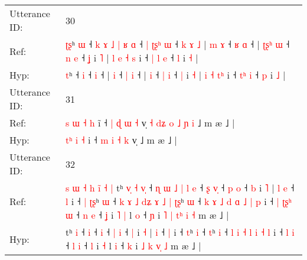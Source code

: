 \documentclass[10pt]{article}
\DeclareRobustCommand{\hl}[1]{{\textcolor{red}{#1}}}
\begin{document}
\begin{longtable}{ll}
 \\
\midrule
Utterance ID: & 30 \\
Ref: & \hl{ʈ}\hl{ʂ}ʰ\hl{ }\hl{ɯ} ˧\hl{ }\hl{k}\hl{ }\hl{ɤ}\hl{ }\hl{˩}\hl{ }\hl{|}\hl{ }\hl{ʁ} \hl{ɑ} ˧\hl{ }\hl{|}\hl{ }\hl{ʈ}\hl{ʂ}\hl{ʰ} \hl{ɯ} ˧\hl{ }\hl{k}\hl{ }\hl{ɤ}\hl{ }\hl{˩} |\hl{ }\hl{m} \hl{ɤ} ˧ \hl{ʁ} \hl{ɑ} ˧ |\hl{ }\hl{ʈ}\hl{ʂ}\hl{ʰ} \hl{ɯ} ˧ \hl{n} \hl{e} ˧ \hl{ʝ} i \hl{˥} | \hl{l} \hl{e} \hl{˧}\hl{ }\hl{s} i ˧ \hl{|}\hl{ }\hl{l} \hl{e} ˧ \hl{l} i \hl{˧} |
 \\
Hyp: & \hl{}\hl{t}ʰ\hl{}\hl{} ˧\hl{}\hl{}\hl{}\hl{}\hl{}\hl{}\hl{}\hl{}\hl{}\hl{} \hl{i} ˧\hl{}\hl{}\hl{}\hl{}\hl{}\hl{} \hl{i} ˧\hl{}\hl{}\hl{}\hl{}\hl{}\hl{} |\hl{}\hl{} \hl{i} ˧ \hl{|} \hl{i} ˧ |\hl{}\hl{}\hl{}\hl{} \hl{i} ˧ \hl{|} \hl{i} ˧ \hl{|} i \hl{˧} | \hl{i} \hl{˧} \hl{}\hl{t}\hl{ʰ} i ˧ \hl{}\hl{t}\hl{ʰ} \hl{i} ˧ \hl{p} i \hl{˩} |
 \\
\midrule
Utterance ID: & 31 \\
Ref: & \hl{s}\hl{ }\hl{ɯ} \hl{˧} \hl{h} i\hl{̃} ˧ \hl{|} \hl{ɖ} \hl{ɯ} \hl{˧} v̩\hl{ }\hl{˧}\hl{ }\hl{d}\hl{ʑ}\hl{ }\hl{o}\hl{ }\hl{˩}\hl{ }\hl{ɲ}\hl{ }\hl{i} ˩ m æ ˩ |
 \\
Hyp: & \hl{}\hl{t}\hl{ʰ} \hl{i} \hl{˧} i\hl{} ˧ \hl{m} \hl{i} \hl{˧} \hl{k} v̩\hl{}\hl{}\hl{}\hl{}\hl{}\hl{}\hl{}\hl{}\hl{}\hl{}\hl{}\hl{}\hl{} ˩ m æ ˩ |
 \\
\midrule
Utterance ID: & 32 \\
Ref: & \hl{s}\hl{ }\hl{ɯ}\hl{ }\hl{˧}\hl{ }\hl{h}\hl{ }\hl{i}\hl{̃}\hl{ }\hl{˧}\hl{ }\hl{|}\hl{ }tʰ\hl{ }\hl{v}\hl{̩}\hl{ }\hl{˧} \hl{v}\hl{̩} ˧\hl{ }\hl{ɳ}\hl{ }\hl{ɯ}\hl{ }\hl{˩}\hl{ }\hl{|}\hl{ }\hl{l} \hl{e} ˧\hl{ }\hl{ʂ} \hl{v}\hl{̩} ˧ \hl{p} \hl{o} ˧ \hl{b} i \hl{˥} |\hl{ }\hl{l} \hl{e} ˧ \hl{l} i ˧\hl{ }\hl{|} \hl{ʈ}\hl{ʂ}ʰ \hl{ɯ} ˧\hl{ }\hl{k}\hl{ }\hl{ɤ}\hl{ }\hl{˩}\hl{ }\hl{d}\hl{ʑ}\hl{ }\hl{ɤ}\hl{ }\hl{˩}\hl{ }\hl{|} \hl{ʈ}\hl{ʂ}ʰ \hl{ɯ} ˧\hl{ }\hl{k} \hl{ɤ} \hl{˩} \hl{d} \hl{ɑ} \hl{˩} \hl{|} \hl{p} i ˧\hl{ }\hl{|} \hl{ʈ}\hl{ʂ}\hl{ʰ} \hl{ɯ} ˧ \hl{n} \hl{e} ˧ \hl{ʝ} i\hl{ }\hl{˥} \hl{|} l \hl{o} ˧ \hl{ɲ} i \hl{˥} \hl{|} \hl{t}\hl{ʰ}\hl{ }\hl{i} \hl{˧} m æ ˩ |
 \\
Hyp: & \hl{}\hl{}\hl{}\hl{}\hl{}\hl{}\hl{}\hl{}\hl{}\hl{}\hl{}\hl{}\hl{}\hl{}\hl{}tʰ\hl{}\hl{}\hl{}\hl{}\hl{} \hl{}\hl{i} ˧\hl{}\hl{}\hl{}\hl{}\hl{}\hl{}\hl{}\hl{}\hl{}\hl{} \hl{i} ˧\hl{}\hl{} \hl{}\hl{i} ˧ \hl{|} \hl{i} ˧ \hl{|} i \hl{˧} |\hl{}\hl{} \hl{i} ˧ \hl{|} i ˧\hl{}\hl{} \hl{}\hl{t}ʰ \hl{i} ˧\hl{}\hl{}\hl{}\hl{}\hl{}\hl{}\hl{}\hl{}\hl{}\hl{}\hl{}\hl{}\hl{}\hl{}\hl{} \hl{}\hl{t}ʰ \hl{i} ˧\hl{}\hl{} \hl{l} \hl{i} \hl{˧} \hl{l} \hl{i} \hl{˧} \hl{l} i ˧\hl{}\hl{} \hl{}\hl{}\hl{l} \hl{i} ˧ \hl{l} \hl{i} ˧ \hl{l} i\hl{}\hl{} \hl{˧} l \hl{i} ˧ \hl{k} i \hl{˩} \hl{k} \hl{}\hl{}\hl{v}\hl{̩} \hl{˩} m æ ˩ |

\end{longtable}
\end{document}

